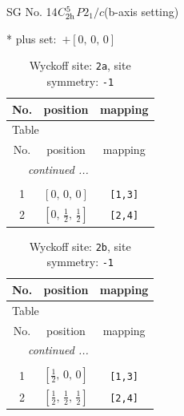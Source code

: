 \documentclass[fleqn,8pt]{jsarticle}
\begin{document}
\setcounter{MaxMatrixCols}{32}

\renewcommand{\tablename}{Table~}
\renewcommand{\figurename}{Figure~}
\begin{center}
\LARGE
SG No. 14\quad$C_{\rm 2h}^{5}$\quad$P2_1/c$\quad(b-axis setting)\quad[ monoclinic ]
\end{center}
* plus set:\,\,\,$+\left[ 0,\, 0,\, 0 \right]$
\renewcommand{\arraystretch}{1.2}
\begin{longtable}{ccc}
\caption{Wyckoff site: {\tt 2a}, site symmetry: {\tt -1}}
 \\
 \hline \hline
No. & position & mapping \\ \hline \endfirsthead

\multicolumn{2}{l}{\tablename\ \thetable{}} \\
 \hline \hline
No. & position & mapping \\ \hline \endhead

 \hline \hline
\multicolumn{2}{r}{\footnotesize\it continued ...} \\ \endfoot

 \hline \hline
\multicolumn{2}{r}{} \\ \endlastfoot

1 & $\left[ 0,\, 0,\, 0 \right]$ & {\tt [1,3]} \\ \hline
2 & $\left[ 0,\, \frac{1}{2},\, \frac{1}{2} \right]$ & {\tt [2,4]} \\
\end{longtable}
\renewcommand{\arraystretch}{1.2}
\begin{longtable}{ccc}
\caption{Wyckoff site: {\tt 2b}, site symmetry: {\tt -1}}
 \\
 \hline \hline
No. & position & mapping \\ \hline \endfirsthead

\multicolumn{2}{l}{\tablename\ \thetable{}} \\
 \hline \hline
No. & position & mapping \\ \hline \endhead

 \hline \hline
\multicolumn{2}{r}{\footnotesize\it continued ...} \\ \endfoot

 \hline \hline
\multicolumn{2}{r}{} \\ \endlastfoot

1 & $\left[ \frac{1}{2},\, 0,\, 0 \right]$ & {\tt [1,3]} \\ \hline
2 & $\left[ \frac{1}{2},\, \frac{1}{2},\, \frac{1}{2} \right]$ & {\tt [2,4]} \\
\end{longtable}
\end{document}
